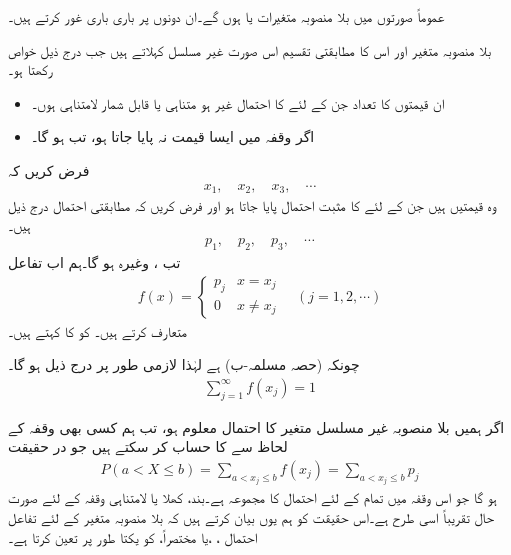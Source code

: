 عموماً صورتوں میں بلا منصوبہ متغیرات  یا  ہوں گے۔ان دونوں پر باری باری غور کرتے ہیں۔

بلا منصوبہ متغیر  اور اس کا مطابقتی تقسیم اس صورت غیر مسلسل کہلاتے ہیں جب  درج ذیل خواص رکھتا ہو۔
\begin{itemize}
\item
ان قیمتوں کا تعداد جن کے لئے  کا احتمال غیر  ہو متناہی یا قابل شمار لامتناہی ہوں۔\\
\item
اگر وقفہ  میں ایسا قیمت نہ پایا جاتا ہو، تب  ہو گا۔ 
\end{itemize}

فرض کریں کہ
\begin{align*}
x_1,\quad x_2,\quad x_3,\quad \cdots
\end{align*}
وہ قیمتیں ہیں جن کے لئے  کا مثبت احتمال پایا جاتا ہو اور فرض کریں کہ مطابقتی احتمال درج ذیل ہیں۔
\begin{align*}
p_1,\quad p_2,\quad p_3,\quad \cdots
\end{align*}
تب ، وغیرہ ہو گا۔ہم اب تفاعل
\begin{align}\label{مساوات_شماریات_غیر_مسلسل_متغیر_ب}
f(x)=
\begin{cases}
p_j& x=x_j\\
0&x\ne x_j
\end{cases}\quad
 (j=1,2,\cdots)
\end{align}
متعارف کرتے ہیں۔ کو  کا  کہتے ہیں۔

چونکہ  (حصہ  مسلمہ-ب) ہے لہٰذا لازمی طور پر درج ذیل ہو گا۔
\begin{align}\label{مساوات_شماریات_غیر_مسلسل_متغیر_پ}
\sum_{j=1}^{\infty} f(x_j)=1
\end{align}

اگر ہمیں بلا منصوبہ غیر مسلسل متغیر  کا احتمال معلوم ہو، تب ہم کسی بھی وقفہ  کے لحاظ سے   کا حساب کر سکتے ہیں جو در حقیقت
\begin{align}\label{مساوات_شماریات_غیر_مسلسل_متغیر_ت}
P(a<X\le b)=\sum_{a<x_j\le b} f(x_j)=\sum_{a<x_j\le b} p_j
\end{align}
ہو گا جو اس وقفہ میں تمام  کے لئے احتمال  کا مجموعہ ہے۔بند، کھلا یا لامتناہی وقفہ کے لئے صورت حال تقریباً اسی طرح ہے۔اس حقیقت کو ہم یوں بیان کرتے ہیں کہ بلا منصوبہ متغیر  کے لئے  تفاعل احتمال ،  ،یا مختصراً،   کو یکتا طور پر تعین کرتا ہے۔

